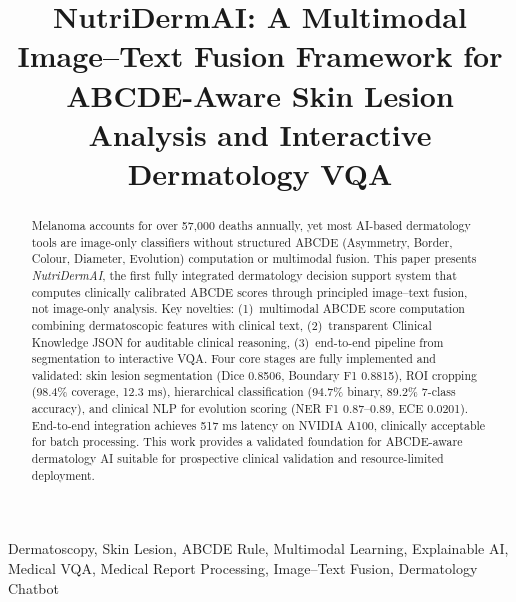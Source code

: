 \documentclass[conference]{IEEEtran}
\begin{document}

\title{NutriDermAI: A Multimodal Image--Text Fusion Framework
for ABCDE-Aware Skin Lesion Analysis and Interactive Dermatology VQA}

\author{
    \and
}

\maketitle

\begin{abstract}
Melanoma accounts for over 57,000 deaths annually, yet most AI-based
dermatology tools are image-only classifiers without structured ABCDE
(Asymmetry, Border, Colour, Diameter, Evolution) computation or
multimodal fusion. This paper presents \emph{NutriDermAI}, the first
fully integrated dermatology decision support system that computes
clinically calibrated ABCDE scores through principled image--text
fusion, not image-only analysis. Key novelties: (1)~multimodal ABCDE
score computation combining dermatoscopic features with clinical text,
(2)~transparent Clinical Knowledge JSON for auditable clinical
reasoning, (3)~end-to-end pipeline from segmentation to interactive
VQA. Four core stages are fully implemented and validated: skin lesion
segmentation (Dice 0.8506, Boundary F1 0.8815), ROI cropping (98.4\%
coverage, 12.3 ms), hierarchical classification (94.7\% binary, 89.2\%
7-class accuracy), and clinical NLP for evolution scoring (NER F1
0.87--0.89, ECE 0.0201). End-to-end integration achieves 517 ms latency
on NVIDIA A100, clinically acceptable for batch processing. This work
provides a validated foundation for ABCDE-aware dermatology AI suitable
for prospective clinical validation and resource-limited deployment.
\end{abstract}

\begin{IEEEkeywords}
Dermatoscopy, Skin Lesion, ABCDE Rule, Multimodal Learning,
Explainable AI, Medical VQA, Medical Report Processing, Image--Text
Fusion, Dermatology Chatbot
\end{IEEEkeywords}
\end{document}
